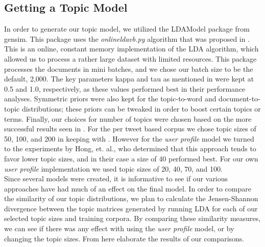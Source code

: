 \documentclass{acm_proc_article-sp}
\begin{document}
\subsection{Getting a Topic Model}
\hspace*{5mm}In order to generate our topic model, we utilized the LDAModel package from gensim. This package uses the \textit{onlineldavb.py} algorithm that was proposed in \cite{hoffman2010online}. This is an online, constant memory implementation of the LDA algorithm, which allowed us to process a rather large dataset with limited resources. This package processes the documents in mini batches, and we chose our batch size to be the default, 2,000. The key parameters kappa and tau as mentioned in \cite{hoffman2010online} were kept at 0.5 and 1.0, respectively, as these values performed best in their performance analyses. Symmetric priors were also kept for the topic-to-word and document-to-topic distributions; these priors can be tweaked in order to boost certain topics or terms. Finally, our choices for number of topics were chosen based on the more successful results seen in \cite{hong2010empirical}. For the per tweet based corpus we chose topic sizes of 50, 100, and 200 in keeping with \cite{godin2013using}. However for the \textit{user profile} model we turned to the experiments by Hong, et. al., who determined that this approach tends to favor lower topic sizes, and in their case a size of 40 performed best. For our own \textit{user profile} implementation we used topic sizes of 20, 40, 70, and 100.\\ 
\hspace*{5mm}Since several models were created, it is informative to see if our various approaches have had much of an effect on the final model. In order to compare the similarity of our topic distributions, we plan to calculate the Jensen-Shannon divergence between the topic matrices generated by running LDA for each of our selected topic sizes and training corpora. By comparing these similarity measures, we can see if there was any effect with using the \textit{user profile} model, or by changing the topic sizes. From here elaborate the results of our comparisons.\\
\end{document}
